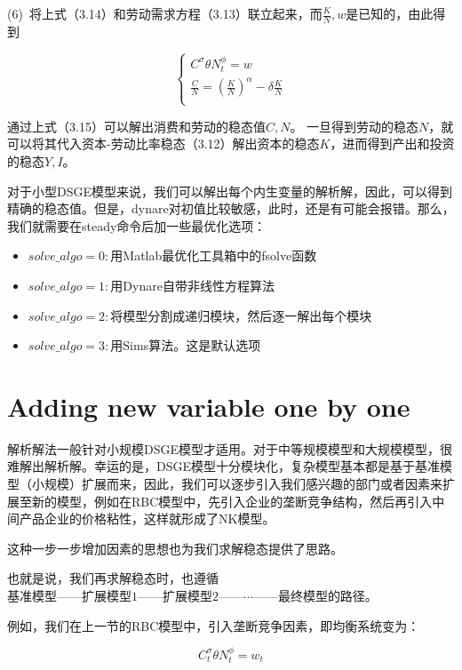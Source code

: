 \documentclass[cn,10pt,math=newtx,citestyle=gb7714-2015,bibstyle=gb7714-2015]{elegantbook}
\begin{document}
	(6)~将上式（3.14）和劳动需求方程（3.13）联立起来，而$\frac{K}{N},w$是已知的，由此得到
	
	\begin{equation}\label{label}
		\left\{
		\begin{aligned}
			C^{\sigma}\theta N_t^{\phi}=w\\
			\frac{C}{N}=(\frac{K}{N})^{\alpha}-\delta \frac{K}{N}\\
		\end{aligned}
		\right.
	\end{equation}
	
	通过上式（3.15）可以解出消费和劳动的稳态值$C,N$。 一旦得到劳动的稳态$N$，就可以将其代入资本-劳动比率稳态（3.12）解出资本的稳态$K$，进而得到产出和投资的稳态$Y,I$。
	
	对于小型DSGE模型来说，我们可以解出每个内生变量的解析解，因此，可以得到精确的稳态值。但是，dynare对初值比较敏感，此时，还是有可能会报错。那么，我们就需要在steady命令后加一些最优化选项：
	
	\begin{itemize}
		\item $solve\_algo=0:$用Matlab最优化工具箱中的fsolve函数
		\item $solve\_algo=1:$用Dynare自带非线性方程算法
		\item $solve\_algo=2:$将模型分割成递归模块，然后逐一解出每个模块
		\item $solve\_algo=3:$用Sims算法。这是默认选项
	\end{itemize}
	
	\section{Adding new variable one by one}
	
	解析解法一般针对小规模DSGE模型才适用。对于中等规模模型和大规模模型，很难解出解析解。幸运的是，DSGE模型十分模块化，复杂模型基本都是基于基准模型（小规模）扩展而来，因此，我们可以逐步引入我们感兴趣的部门或者因素来扩展至新的模型，例如在RBC模型中，先引入企业的垄断竞争结构，然后再引入中间产品企业的价格粘性，这样就形成了NK模型。
	
	这种一步一步增加因素的思想也为我们求解稳态提供了思路。
	
	也就是说，我们再求解稳态时，也遵循$基准模型——扩展模型1——扩展模型2——\cdots —— 最终模型$的路径。
	
	例如，我们在上一节的RBC模型中，引入垄断竞争因素，即均衡系统变为：
	
	\begin{equation}\label{label}
		C_t^{\sigma}\theta N_t^{\phi}=w_t
	\end{equation}
	
\end{document}
